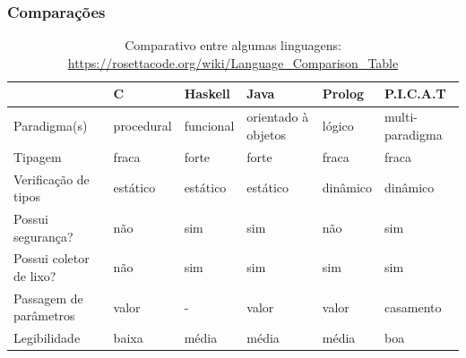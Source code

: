 \documentclass[10pt]{beamer}
\begin{document}
\begin{frame}
    \frametitle{Comparações}
    \begin{table}[!bh]
\centering
\caption{Comparativo entre algumas linguagens: \url{https://rosettacode.org/wiki/Language_Comparison_Table}}
\label{tabela_ling_refs}
{\tiny
\begin{tabular}{p{2cm}|p{1cm}|p{1cm}|p{1cm}|p{1cm}|p{1cm}}\hline \hline
      &\textbf{C}  &  \textbf{Haskell} &  \textbf{Java} &  \textbf{Prolog} &  \textbf{P.I.C.A.T}\\ \hline \hline
	    
Paradigma(s)	                        & procedural                                    & funcional                               & orientado à objetos   &  lógico                                             & multi-paradigma \\
\hline 

Tipagem	        & fraca                                         & forte                                   & forte                  &  fraca                                                         & fraca \\
\hline 

Verificação de tipos	                & estático                                      & estático                                & estático                              & dinâmico                                   & dinâmico \\

\hline  
Possui segurança?	                & não                                             & sim                                      & sim                                            & não                                          & sim\\

\hline  
Possui coletor de lixo?	                        & não                                                                        & sim                 &  sim                  & sim                                     & sim \\

\hline  
Passagem de parâmetros	                &  valor & -                                       &  valor                                     &  valor & casamento \\

\hline   
Legibilidade	  & baixa   & média     & média &  média       & boa \\


\hline 
\hline
\end{tabular} 
}

\end{table}
\end{frame}
\end{document}
